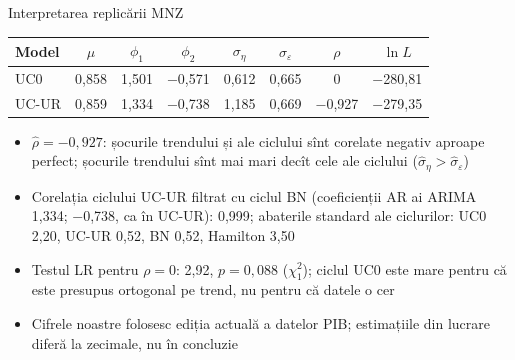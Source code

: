 \begin{frame}{Interpretarea replicării MNZ}
\itemsize{\footnotesize}
\begin{center}
\footnotesize
\begin{tabular}{lccccccc}
\toprule
Model & $\mu$ & $\phi_1$ & $\phi_2$ & $\sigma_\eta$ & $\sigma_\varepsilon$ & $\rho$ & $\ln L$ \\
\midrule
UC0 & 0{,}858 & 1{,}501 & \ensuremath{-}0{,}571 & 0{,}612 & 0{,}665 & 0 & \ensuremath{-}280{,}81 \\
UC-UR & 0{,}859 & 1{,}334 & \ensuremath{-}0{,}738 & 1{,}185 & 0{,}669 & \ensuremath{-}0{,}927 & \ensuremath{-}279{,}35 \\
\bottomrule
\end{tabular}
\end{center}
\begin{itemize}
    \item $\hat\rho = \ensuremath{-}0{,}927$: șocurile trendului și ale ciclului sînt corelate negativ aproape perfect; șocurile trendului sînt mai mari decît cele ale ciclului ($\hat\sigma_\eta > \hat\sigma_\varepsilon$)
    \item Corelația ciclului UC-UR filtrat cu ciclul BN (coeficienții AR ai ARIMA 1{,}334; \ensuremath{-}0{,}738, ca în UC-UR): 0{,}999; abaterile standard ale ciclurilor: UC0 2{,}20, UC-UR 0{,}52, BN 0{,}52, Hamilton 3{,}50
    \item Testul LR pentru $\rho = 0$: 2{,}92, $p = 0{,}088$ ($\chi^2_1$); ciclul UC0 este mare pentru că este presupus ortogonal pe trend, nu pentru că datele o cer
    \item Cifrele noastre folosesc ediția actuală a datelor PIB; estimațiile din lucrare diferă la zecimale, nu în concluzie
\end{itemize}
\end{frame}

